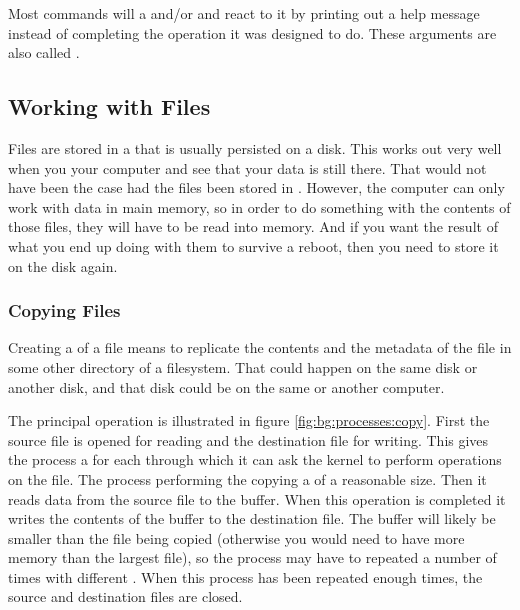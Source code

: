 Most commands will  a  and/or   and react to it by printing out a help message instead of completing the operation it was designed to do. These arguments are also called .

\subsection{Working with Files}

Files are stored in a  that is usually persisted on a disk. This works out very well when you  your computer and see that your data is still there. That would not have been the case had the files been stored in . However, the computer can only work with data in main memory, so in order to do something with the contents of those files, they will have to be read into memory. And if you want the result of what you end up doing with them to survive a reboot, then you need to store it on the disk again.

\subsubsection{Copying Files}

Creating a  of a file means to replicate the contents and the metadata of the file in some other directory of a filesystem. That could happen on the same disk or another disk, and that disk could be on the same or another computer.

The principal operation is illustrated in figure \ref{fig:bg:processes:copy}. First the source file is opened for reading and the destination file for writing. This gives the process a  for each through which it can ask the kernel to perform operations on the file. The process performing the copying  a  of a reasonable size. Then it reads data from the source file to the buffer. When this operation is completed it writes the contents of the buffer to the destination file. The buffer will likely be smaller than the file being copied (otherwise you would need to have more memory than the largest file), so the process may have to repeated a number of times with different . When this process has been repeated enough times, the source and destination files are closed.


